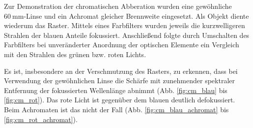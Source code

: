 Zur Demonstration der chromatischen Abberation wurden eine gewöhnliche $\SI{60}{\milli\meter}$-Linse und ein Achromat gleicher Brennweite eingesetzt. Als Objekt diente wiederum das Raster. Mittels eines Farbfilters wurden jeweils die kurzwelligeren Strahlen der blauen Anteile fokussiert. Anschließend folgte durch Umschalten des Farbfilters bei unveränderter Anordnung der optischen Elemente ein Vergleich mit den Strahlen des grünen bzw. roten Lichts.

Es ist, insbesondere an der Verschmutzung des Rasters, zu erkennen, dass bei Verwendung der gewöhnlichen Linse die Schärfe mit zunehmender spektraler Entfernung der fokussierten Wellenlänge abnimmt (Abb. \ref{fig:cm_blau} bis \ref{fig:cm_rot}). Das rote Licht ist gegenüber dem blauen deutlich defokussiert. Beim Achromaten ist das nicht der Fall (Abb. \ref{fig:cm_blau_achromat} bis \ref{fig:cm_rot_achromat}).

